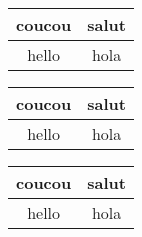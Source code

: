 \documentclass[10pt,a4paper]{nsibook}
\begin{document}

\tabulardefault
\begin{tabular}{|c|c|}
    \hline
    coucou & salut \\
    \hline
    hello  & hola \\
    \hline
\end{tabular}

\tabularstyled
\begin{tabular}{|c|c|}
    \hline
    coucou & salut \\
    \hline
    hello  & hola \\
    \hline
\end{tabular}

\tabulardefault
\begin{tabular}{|c|c|}
    \hline
    coucou & salut \\
    \hline
    hello  & hola \\
    \hline
\end{tabular}
\end{document}
